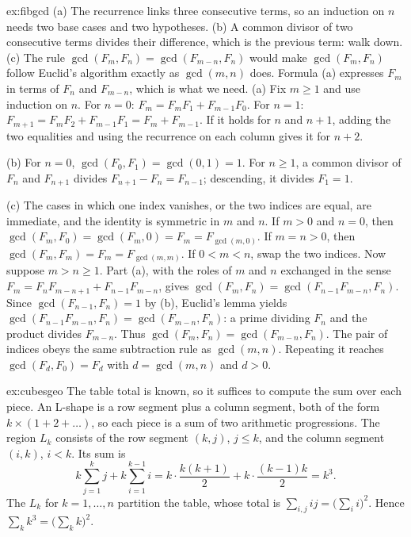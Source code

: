 \begin{solution}{ex:fibgcd}
\idea (a) The recurrence links three consecutive terms, so an induction on $n$ needs two base cases and two hypotheses. (b) A common divisor of two consecutive terms divides their difference, which is the previous term: walk down. (c) The rule $\gcd(F_m,F_n)=\gcd(F_{m-n},F_n)$ would make $\gcd(F_m,F_n)$ follow Euclid's algorithm exactly as $\gcd(m,n)$ does. Formula (a) expresses $F_m$ in terms of $F_n$ and $F_{m-n}$, which is what we need.
\writeup (a) Fix $m\ge1$ and use induction on $n$. For $n=0$: $F_m=F_mF_1+F_{m-1}F_0$.
For $n=1$: $F_{m+1}=F_mF_2+F_{m-1}F_1=F_m+F_{m-1}$. If it holds for $n$ and $n+1$, adding the two
equalities and using the recurrence on each column gives it for $n+2$.

(b) For $n=0$, $\gcd(F_0,F_1)=\gcd(0,1)=1$. For $n\ge1$, a common divisor of $F_n$ and $F_{n+1}$ divides $F_{n+1}-F_n=F_{n-1}$; descending, it divides $F_1=1$.

(c) The cases in which one index vanishes, or the two indices are equal, are immediate, and the identity is symmetric in $m$ and $n$. If $m>0$ and $n=0$, then $\gcd(F_m,F_0)=\gcd(F_m,0)=F_m=F_{\gcd(m,0)}$. If $m=n>0$, then $\gcd(F_m,F_m)=F_m=F_{\gcd(m,m)}$. If $0<m<n$, swap the two indices. Now suppose $m>n\ge1$. Part (a), with the roles of $m$ and $n$ exchanged in the sense $F_m=F_nF_{m-n+1}+F_{n-1}F_{m-n}$, gives
$\gcd(F_m,F_n)=\gcd(F_{n-1}F_{m-n},F_n)$. Since $\gcd(F_{n-1},F_n)=1$ by (b), Euclid's lemma yields $\gcd(F_{n-1}F_{m-n},F_n)=\gcd(F_{m-n},F_n)$: a prime dividing $F_n$ and the product divides $F_{m-n}$. Thus $\gcd(F_m,F_n)=\gcd(F_{m-n},F_n)$. The pair of indices obeys the same subtraction rule as $\gcd(m,n)$. Repeating it reaches $\gcd(F_d,F_0)=F_d$ with $d=\gcd(m,n)$ and $d>0$.
\end{solution}

\begin{solution}{ex:cubesgeo}
\idea The table total is known, so it suffices to compute the sum over each piece. An L-shape is a row segment plus a column segment, both of the form $k\times(1+2+\dots)$, so each piece is a sum of two arithmetic progressions.
\writeup The region $L_k$ consists of the row segment $(k,j)$, $j\le k$, and the column segment $(i,k)$, $i<k$. Its sum is
\[
k\sum_{j=1}^kj+k\sum_{i=1}^{k-1}i=k\cdot\frac{k(k+1)}2+k\cdot\frac{(k-1)k}2=k^3.
\]
The $L_k$ for $k=1,\dots,n$ partition the table, whose total is $\sum_{i,j}ij=\bigl(\sum_i i\bigr)^2$. Hence
$\sum_k k^3=\bigl(\sum_k k\bigr)^2$.
\end{solution}

